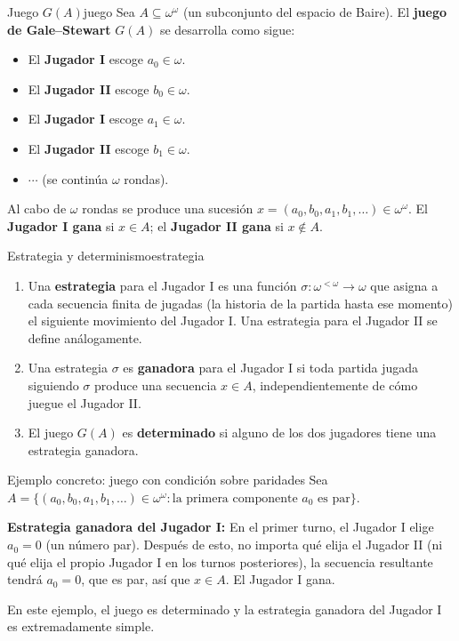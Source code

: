 \begin{definicion}{Juego $G(A)$}{juego}
Sea $A \subseteq \omega^\omega$ (un subconjunto del espacio de Baire). El \textbf{juego de Gale--Stewart} $G(A)$ se desarrolla como sigue:
\begin{itemize}[leftmargin=2em]
  \item El \textbf{Jugador I} escoge $a_0 \in \omega$.
  \item El \textbf{Jugador II} escoge $b_0 \in \omega$.
  \item El \textbf{Jugador I} escoge $a_1 \in \omega$.
  \item El \textbf{Jugador II} escoge $b_1 \in \omega$.
  \item $\cdots$ (se continúa $\omega$ rondas).
\end{itemize}
Al cabo de $\omega$ rondas se produce una sucesión $x = (a_0, b_0, a_1, b_1, \ldots) \in \omega^\omega$. El \textbf{Jugador I gana} si $x \in A$; el \textbf{Jugador II gana} si $x \notin A$.
\end{definicion}

\begin{definicion}{Estrategia y determinismo}{estrategia}
\begin{enumerate}[leftmargin=2em, label=(\alph*)]
  \item Una \textbf{estrategia} para el Jugador I es una función $\sigma: \omega^{<\omega} \to \omega$ que asigna a cada secuencia finita de jugadas (la historia de la partida hasta ese momento) el siguiente movimiento del Jugador I. Una estrategia para el Jugador II se define análogamente.
  \item Una estrategia $\sigma$ es \textbf{ganadora} para el Jugador I si toda partida jugada siguiendo $\sigma$ produce una secuencia $x \in A$, independientemente de cómo juegue el Jugador II.
  \item El juego $G(A)$ es \textbf{determinado} si alguno de los dos jugadores tiene una estrategia ganadora.
\end{enumerate}
\end{definicion}

\begin{ejemplo}{Ejemplo concreto: juego con condición sobre paridades}{}
Sea $A = \{(a_0, b_0, a_1, b_1, \ldots) \in \omega^\omega : \text{la primera componente } a_0 \text{ es par}\}$.

\medskip
\textbf{Estrategia ganadora del Jugador I:} En el primer turno, el Jugador I elige $a_0 = 0$ (un número par). Después de esto, no importa qué elija el Jugador II (ni qué elija el propio Jugador I en los turnos posteriores), la secuencia resultante tendrá $a_0 = 0$, que es par, así que $x \in A$. El Jugador I gana.

\medskip
En este ejemplo, el juego es determinado y la estrategia ganadora del Jugador I es extremadamente simple.
\end{ejemplo}

